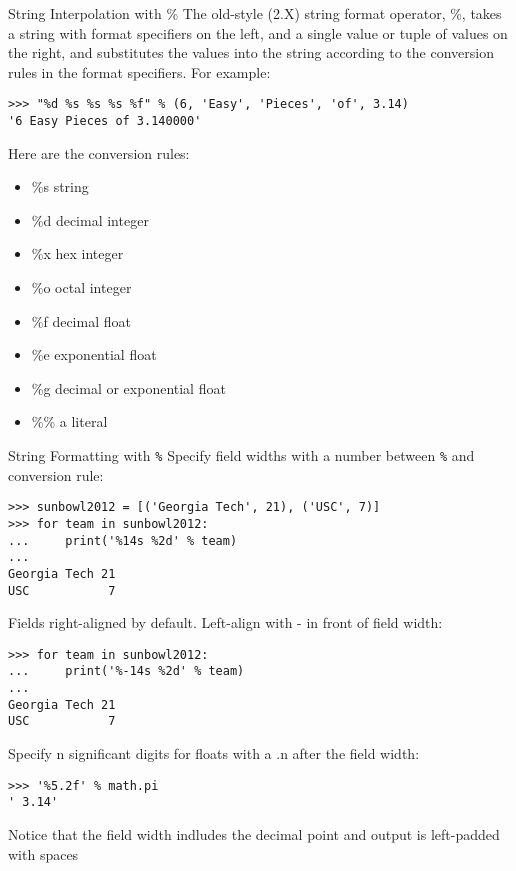 \documentclass[smaller, aspectratio=1610]{beamer}
\begin{document}
\begin{frame}[label={sec:orgbc22626},fragile]{String Interpolation with \%}
 The old-style (2.X) string format operator, \%, takes a string with format
specifiers on the left, and a single value or tuple of values on the right,
and substitutes the values into the string according to the conversion
rules in the format specifiers. For example:

\lstset{language=Python,label= ,caption= ,captionpos=b,numbers=none}
\begin{lstlisting}
>>> "%d %s %s %s %f" % (6, 'Easy', 'Pieces', 'of', 3.14)
'6 Easy Pieces of 3.140000'
\end{lstlisting}

Here are the conversion rules:

\begin{itemize}
\item \%s string
\item \%d decimal integer
\item \%x hex integer
\item \%o octal integer
\item \%f decimal float
\item \%e exponential float
\item \%g decimal or exponential float
\item \%\% a literal
\end{itemize}
\end{frame}

\begin{frame}[label={sec:orga202cf7},fragile]{String Formatting with \texttt{\%}}
 Specify field widths with a number between \texttt{\%} and conversion rule:

\lstset{language=Python,label= ,caption= ,captionpos=b,numbers=none}
\begin{lstlisting}
>>> sunbowl2012 = [('Georgia Tech', 21), ('USC', 7)]
>>> for team in sunbowl2012:
...     print('%14s %2d' % team)
...
Georgia Tech 21
USC           7
\end{lstlisting}
Fields right-aligned by default. Left-align with - in front of field width:

\lstset{language=Python,label= ,caption= ,captionpos=b,numbers=none}
\begin{lstlisting}
>>> for team in sunbowl2012:
...     print('%-14s %2d' % team)
...
Georgia Tech 21
USC           7
\end{lstlisting}

Specify n significant digits for floats with a .n after the field width:

\lstset{language=Python,label= ,caption= ,captionpos=b,numbers=none}
\begin{lstlisting}
>>> '%5.2f' % math.pi
' 3.14'
\end{lstlisting}
Notice that the field width indludes the decimal point and output is
left-padded with spaces
\end{frame}
\end{document}
